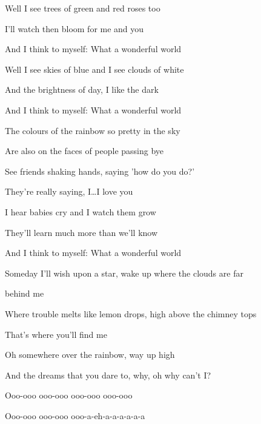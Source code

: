 \begin{song}
\bigskip

Well I see trees of green and  red roses too \par
{} I'll watch then bloom for  me and you \par
And I  think to myself:  What a wonderful world  \par

\bigskip

Well I see skies of blue and I see  clouds of white \par
And the brightness of day,  I like the dark \par
And I  think to myself:  What a wonderful world  \par

\bigskip

The colours of the rainbow so pretty in the sky \par
Are also on the faces of people passing bye \par
See friends shaking hands, saying  'how do you do?' \par
{} They're really saying, I…I love you \par

\bigskip

I hear babies cry and I  watch them grow \par
{} They'll learn much more  than we'll know \par
And I  think to myself:  What a wonderful world  \par

\bigskip

Someday I'll wish upon a star, wake up where the clouds are far \par
behind me \par
Where trouble melts like lemon drops, high above the chimney tops \par
That's where you'll find me \par

\bigskip

Oh somewhere over the rainbow,  way up high \par
{}And the dreams that you dare to, why, oh why can't I?  \par

\bigskip

Ooo-ooo  ooo-ooo  ooo-ooo  ooo-ooo \par
{}Ooo-ooo  ooo-ooo  ooo-a-eh-a-a-a-a-a-a \par


\end{song}
